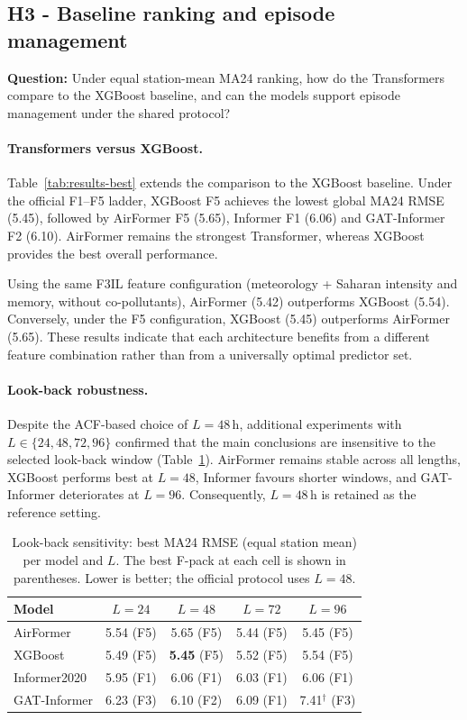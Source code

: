\documentclass[11pt]{article}
\begin{document}
\subsection{H3 - Baseline ranking and episode management}
\label{sec:results-h3}
\label{sec:results-baseline}
\label{sec:results-management}
\label{sec:results-seqlen}

\textbf{Question:} Under equal station-mean MA24 ranking, how do the Transformers compare to the XGBoost baseline, and can the models support episode management under the shared protocol?

\paragraph{Transformers versus XGBoost.}
Table~\ref{tab:results-best} extends the comparison to the XGBoost baseline. Under the official F1--F5 ladder, XGBoost F5 achieves the lowest global MA24 RMSE (5.45), followed by AirFormer F5 (5.65), Informer F1 (6.06) and GAT-Informer F2 (6.10). AirFormer remains the strongest Transformer, whereas XGBoost provides the best overall performance.

Using the same F3IL feature configuration (meteorology + Saharan intensity and memory, without co-pollutants), AirFormer (5.42) outperforms XGBoost (5.54). Conversely, under the F5 configuration, XGBoost (5.45) outperforms AirFormer (5.65). These results indicate that each architecture benefits from a different feature combination rather than from a universally optimal predictor set.

\paragraph{Look-back robustness.}
Despite the ACF-based choice of $L{=}48$\,h, additional experiments with $L\in\{24,48,72,96\}$ confirmed that the main conclusions are insensitive to the selected look-back window (Table~\ref{tab:seqlen}). AirFormer remains stable across all lengths, XGBoost performs best at $L{=}48$, Informer favours shorter windows, and GAT-Informer deteriorates at $L{=}96$. Consequently, $L{=}48$\,h is retained as the reference setting.

\begin{table}[H]
\centering
\caption{Look-back sensitivity: best MA24 RMSE (equal station mean) per model and $L$. The best F-pack at each cell is shown in parentheses. Lower is better; the official protocol uses $L{=}48$.}
\label{tab:seqlen}
\footnotesize
\begin{tabular}{@{}lcccc@{}}
\toprule
Model & $L{=}24$ & $L{=}48$ & $L{=}72$ & $L{=}96$ \\
\midrule
AirFormer & 5.54 (F5) & 5.65 (F5) & 5.44 (F5) & 5.45 (F5) \\
XGBoost & 5.49 (F5) & \textbf{5.45} (F5) & 5.52 (F5) & 5.54 (F5) \\
Informer2020 & 5.95 (F1) & 6.06 (F1) & 6.03 (F1) & 6.06 (F1) \\
GAT-Informer & 6.23 (F3) & 6.10 (F2) & 6.09 (F1) & 7.41$^\dagger$ (F3) \\
\bottomrule
\end{tabular}
\end{table}
\end{document}

